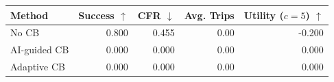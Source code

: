 \begin{tabular}{lrrrr}
\toprule
Method & Success $\uparrow$ & CFR $\downarrow$ & Avg. Trips & Utility ($c=5$) $\uparrow$ \\
\midrule
No CB & 0.800 & 0.455 & 0.00 & -0.200 \\
AI-guided CB & 0.000 & 0.000 & 0.00 & 0.000 \\
Adaptive CB & 0.000 & 0.000 & 0.00 & 0.000 \\
\bottomrule
\end{tabular}

